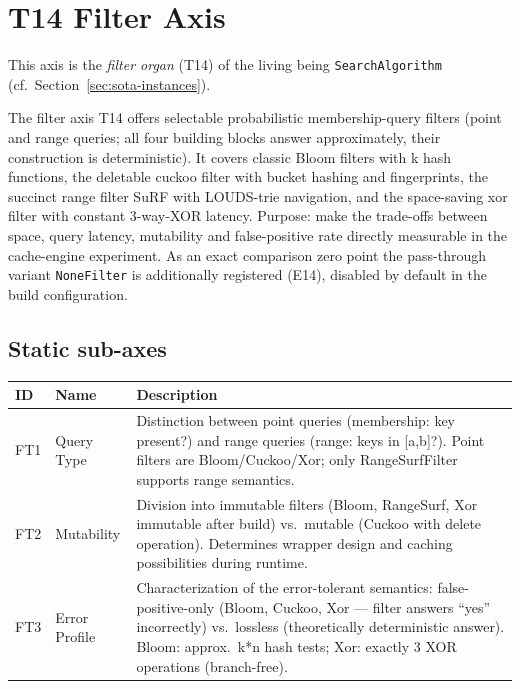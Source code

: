 \section{T14 Filter Axis}

This axis is the \emph{filter organ} (T14) of the living being \texttt{SearchAlgorithm} (cf.\ Section~\ref{sec:sota-instances}).

The filter axis T14 offers selectable probabilistic membership-query filters (point and range queries; all four building blocks answer approximately, their construction is deterministic). It covers classic Bloom filters with k hash functions, the deletable cuckoo filter with bucket hashing and fingerprints, the succinct range filter Su\allowbreak{}RF with LOUDS-trie navigation, and the space-saving xor filter with constant 3-way-XOR latency. Purpose: make the trade-offs between space, query latency, mutability and false-positive rate directly measurable in the cache-engine experiment. As an exact comparison zero point the pass-through variant \texttt{None\allowbreak{}Filter} is additionally registered (E14), disabled by default in the build configuration.

\subsection*{Static sub-axes}

\begin{scriptsize}
\begin{longtable}{@{}>{\raggedright\arraybackslash}p{1.8cm} >{\raggedright\arraybackslash}p{3.2cm} >{\raggedright\arraybackslash}p{8.5cm}@{}}
\toprule
ID & Name & Description \\
\midrule
\endhead%
FT1 & Query Type & Distinction between point queries (membership: key present?) and range queries (range: keys in [a,b]?). Point filters are Bloom/\allowbreak{}Cuckoo/\allowbreak{}Xor; only Range\allowbreak{}Surf\allowbreak{}Filter supports range semantics. \\
FT2 & Mutability & Division into immutable filters (Bloom, Range\allowbreak{}Surf, Xor immutable after build) vs.\ mutable (Cuckoo with delete operation). Determines wrapper design and caching possibilities during runtime. \\
FT3 & Error Profile & Characterization of the error-tolerant semantics: false-positive-only (Bloom, Cuckoo, Xor --- filter answers \enquote{yes} incorrectly) vs.\ lossless (theoretically deterministic answer). Bloom: approx.\ k*n hash tests; Xor: exactly 3 XOR operations (branch-free). \\
\bottomrule
\end{longtable}
\end{scriptsize}

